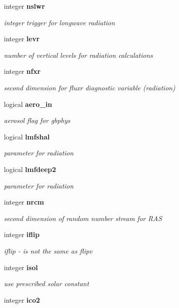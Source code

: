 \begin{DoxyCompactItemize}
integer \textbf{ nslwr}
\begin{DoxyCompactList}\small\item\em integer trigger for longwave radiation \end{DoxyCompactList}\item 
integer \textbf{ levr}
\begin{DoxyCompactList}\small\item\em number of vertical levels for radiation calculations \end{DoxyCompactList}\item 
integer \textbf{ nfxr}
\begin{DoxyCompactList}\small\item\em second dimension for fluxr diagnostic variable (radiation) \end{DoxyCompactList}\item 
logical \textbf{ aero\+\_\+in}
\begin{DoxyCompactList}\small\item\em aerosol flag for gbphys \end{DoxyCompactList}\item 
logical \textbf{ lmfshal}
\begin{DoxyCompactList}\small\item\em parameter for radiation \end{DoxyCompactList}\item 
logical \textbf{ lmfdeep2}
\begin{DoxyCompactList}\small\item\em parameter for radiation \end{DoxyCompactList}\item 
integer \textbf{ nrcm}
\begin{DoxyCompactList}\small\item\em second dimension of random number stream for R\+AS \end{DoxyCompactList}\item 
integer \textbf{ iflip}
\begin{DoxyCompactList}\small\item\em iflip -\/ is not the same as flipv \end{DoxyCompactList}\item 
integer \textbf{ isol}
\begin{DoxyCompactList}\small\item\em use prescribed solar constant \end{DoxyCompactList}\item 
integer \textbf{ ico2}

\end{DoxyCompactItemize}
